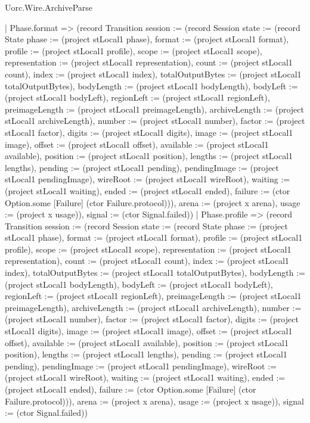 \begin{lexlean}{Uorc.Wire.ArchiveParse}
\begin{semanticmodule}
{    | Phase.format => (record Transition {session := (record Session {state := (record State {phase := (project stLocal1 phase), format := (project stLocal1 format), profile := (project stLocal1 profile), scope := (project stLocal1 scope), representation := (project stLocal1 representation), count := (project stLocal1 count), index := (project stLocal1 index), totalOutputBytes := (project stLocal1 totalOutputBytes), bodyLength := (project stLocal1 bodyLength), bodyLeft := (project stLocal1 bodyLeft), regionLeft := (project stLocal1 regionLeft), preimageLength := (project stLocal1 preimageLength), archiveLength := (project stLocal1 archiveLength), number := (project stLocal1 number), factor := (project stLocal1 factor), digits := (project stLocal1 digits), image := (project stLocal1 image), offset := (project stLocal1 offset), available := (project stLocal1 available), position := (project stLocal1 position), lengths := (project stLocal1 lengths), pending := (project stLocal1 pending), pendingImage := (project stLocal1 pendingImage), wireRoot := (project stLocal1 wireRoot), waiting := (project stLocal1 waiting), ended := (project stLocal1 ended), failure := (ctor Option.some [Failure] (ctor Failure.protocol))}), arena := (project x arena), usage := (project x usage)}), signal := (ctor Signal.failed)})
    | Phase.profile => (record Transition {session := (record Session {state := (record State {phase := (project stLocal1 phase), format := (project stLocal1 format), profile := (project stLocal1 profile), scope := (project stLocal1 scope), representation := (project stLocal1 representation), count := (project stLocal1 count), index := (project stLocal1 index), totalOutputBytes := (project stLocal1 totalOutputBytes), bodyLength := (project stLocal1 bodyLength), bodyLeft := (project stLocal1 bodyLeft), regionLeft := (project stLocal1 regionLeft), preimageLength := (project stLocal1 preimageLength), archiveLength := (project stLocal1 archiveLength), number := (project stLocal1 number), factor := (project stLocal1 factor), digits := (project stLocal1 digits), image := (project stLocal1 image), offset := (project stLocal1 offset), available := (project stLocal1 available), position := (project stLocal1 position), lengths := (project stLocal1 lengths), pending := (project stLocal1 pending), pendingImage := (project stLocal1 pendingImage), wireRoot := (project stLocal1 wireRoot), waiting := (project stLocal1 waiting), ended := (project stLocal1 ended), failure := (ctor Option.some [Failure] (ctor Failure.protocol))}), arena := (project x arena), usage := (project x usage)}), signal := (ctor Signal.failed)})
}
\end{semanticmodule}
\end{lexlean}
